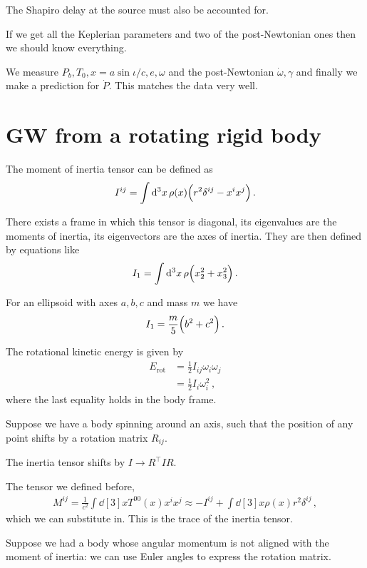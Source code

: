 \documentclass[main.tex]{subfiles}
\begin{document}
The Shapiro delay at the source must also be accounted for. 

If we get all the Keplerian parameters and two of the post-Newtonian ones then we should know everything.

We measure \(P_b, T_0, x= a \sin \iota /c, e, \omega \) and the post-Newtonian \(\dot{\omega}, \gamma \) and finally we make a prediction for \(\dot{P}\). This matches the data very well.

\section{GW from a rotating rigid body}

The moment of inertia tensor can be defined as 
%
\begin{align}
I^{ij} = \int \dd[3]{x} \rho (x) \qty(r^2 \delta^{ij} - x^{i} x^{j})
\,.
\end{align}

There exists a frame in which this tensor is diagonal, its eigenvalues are the moments of inertia, its eigenvectors are the axes of inertia.
They are then defined by equations like 
%
\begin{align}
I_1 = \int \dd[3]{x} \rho \qty(x_2^2 + x_3^2) 
\,.
\end{align}
 
For an ellipsoid with axes \(a, b, c\) and mass \(m\) we have 
%
\begin{align}
I_1 = \frac{m}{5} \qty(b^2 +c^2)
\,.
\end{align}

The rotational kinetic energy is given by 
%
\begin{subequations}
\begin{align}
E _{\text{rot}} &= \frac{1}{2} I_{ij} \omega_{i} \omega_{j} \\ 
&= \frac{1}{2} I_i \omega_{i}^2
\,,
\end{align}
\end{subequations}
%
where the last equality holds in the body frame. 

Suppose we have a body spinning around an axis, such that the position of any point shifts by a rotation matrix \(R_{ij}\). 

The inertia tensor shifts by \(I \rightarrow R^{\top} I R\).

The tensor we defined before, 
%
\begin{align}
M^{ij} = \frac{1}{c^2} \int \dd[3]{x} T^{00} (x) x^{i} x^{j} 
\approx - I^{ij} + \int \dd[3]{x} \rho (x) r^2 \delta^{ij}
\,,
\end{align}
%
which we can substitute in. This is the trace of the inertia tensor. 

Suppose we had a body whose angular momentum is not aligned with the moment of inertia: we can use Euler angles to express the rotation matrix.
\end{document}
